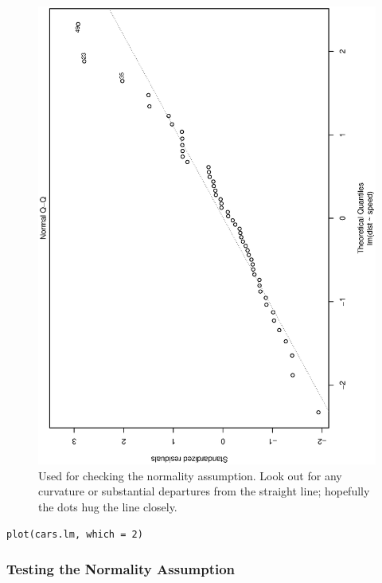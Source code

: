 \documentclass[captions=tableheading]{scrbook}
\begin{document}
\begin{figure}[th]
  \includegraphics[angle=270, totalheight=4in]{ps/slr/Normal-q-q-plot-cars.ps}
  \caption[Normal q-q plot of the residuals for the \texttt{cars} data]{\small Used for checking the normality assumption. Look out for
any curvature or substantial departures from the straight line; hopefully
the dots hug the line closely.}
  \label{fig-Normal-q-q-plot-cars}
\end{figure}



\lstset{language=R}
\begin{lstlisting}
plot(cars.lm, which = 2)
\end{lstlisting}
\subsubsection{Testing the Normality Assumption}
\label{sec-11-4-1-1}
\end{document}
